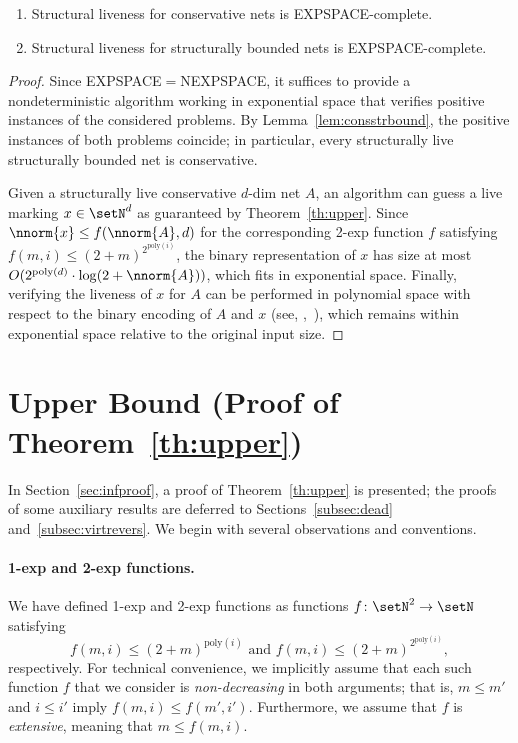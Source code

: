 \begin{cor}\label{cor:conservEScomplete}
\hfill
	\begin{enumerate}
		\item			
	Structural liveness for conservative nets is EXPSPACE-complete.
\item
	Structural liveness for structurally bounded nets is EXPSPACE-complete.
	\end{enumerate}
	\end{cor}	
\begin{proof}
	Since EXPSPACE$=$NEXPSPACE,
it suffices to provide a nondeterministic algorithm working in
	exponential space
	that verifies positive instances of the considered problems.
	By Lemma~\ref{lem:consstrbound}, the positive instances of
	both problems coincide; in particular, every structurally live
	structurally bounded net is conservative. 

	Given a structurally live conservative $d$-dim net $A$, an 
	algorithm can guess a live
	marking $x\in\setN^d$ as guaranteed by Theorem~\ref{th:upper}.
 Since  $\nnorm{x}\leq f(\nnorm{A},d)$ for the corresponding 2-exp function
	$f$
	satisfying	$f(m,i)\leq(2+m)^{2^{\text{poly}(i)}}$, the
	binary representation of $x$ has size at most
	$O(2^{\text{poly}(d)}\cdot\log (2+\nnorm{A}))$, which fits in exponential space.
Finally, verifying the liveness of $x$ for $A$ can be performed in
	polynomial space with respect to
	the binary encoding of $A$ and $x$ (see, \eg,~\cite[Lemma
	5]{DBLP:conf/apn/MayrW14}), which remains within exponential
	space relative to the original input size. 
\end{proof}
\section{Upper Bound (Proof of Theorem~\ref{th:upper})}\label{sec:upperbound}
In Section~\ref{sec:infproof}, a proof of Theorem~\ref{th:upper} is
presented; the proofs of some auxiliary results are deferred to
Sections~\ref{subsec:dead} and~\ref{subsec:virtrevers}. 
We begin with several
observations and conventions.


\paragraph{1-exp and 2-exp functions.}

We have defined 1-exp and 2-exp functions as functions $f\colon\setN^2\to\setN$
satisfying
\begin{equation*}
	f(m,i)\leq (2+m)^{\text{poly}(i)}\text{ and }
f(m,i)\leq (2+m)^{2^{\text{poly}(i)}},
\end{equation*}
	respectively.
For technical convenience, we implicitly assume that each such 
function $f$ that we consider is \emph{non-decreasing} in both arguments; that is, 
$m \leq m'$ and $i \leq i'$ imply $f(m, i) \leq f(m', i')$. 
Furthermore, we assume that $f$ is \emph{extensive}, meaning that $m \leq f(m,i)$.

